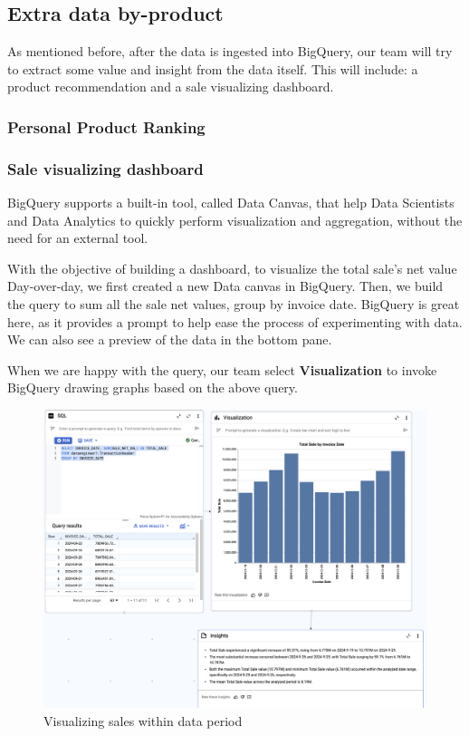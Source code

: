 \subsection{Extra data by-product}

As mentioned before, after the data is ingested into BigQuery, our team will try to extract some
value and insight from the data itself. This will include: a product recommendation and a sale
visualizing dashboard.

\subsubsection{Personal Product Ranking}

\subsubsection{Sale visualizing dashboard}
BigQuery supports a built-in tool, called Data Canvas, that help Data Scientists and Data Analytics
to quickly perform visualization and aggregation, without the need for an external tool.

With the objective of building a dashboard, to visualize the total sale's net value Day-over-day, we
first created a new Data canvas in BigQuery. Then, we build the query to sum all the sale net
values, group by invoice date. BigQuery is great here, as it provides a prompt to help ease the
process of experimenting with data. We can also see a preview of the data in the bottom pane.

When we are happy with the query, our team select \textbf{Visualization} to invoke BigQuery drawing
graphs based on the above query.

\begin{figure}[htp]
    \centering
    \includegraphics[width=\linewidth]{images/data_canvas.png}
    \caption{Visualizing sales within data period}
\end{figure}

